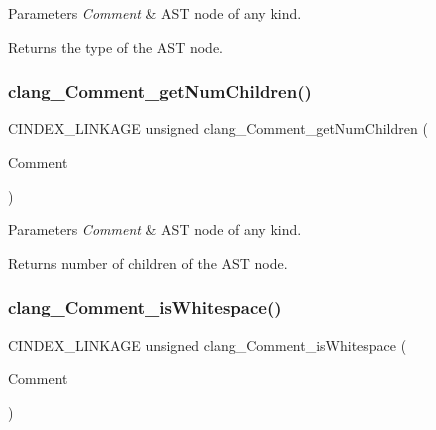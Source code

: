 \begin{DoxyParams}{Parameters}
{\em Comment} & A\+ST node of any kind.\\
\hline
\end{DoxyParams}
\begin{DoxyReturn}{Returns}
the type of the A\+ST node. 
\end{DoxyReturn}
\mbox{\label{group__CINDEX__COMMENT_gaad4eba69493735a4db462bb4b5bed97a}} 
\subsubsection{\texorpdfstring{clang\+\_\+\+Comment\+\_\+get\+Num\+Children()}{clang\_Comment\_getNumChildren()}}
{\footnotesize\ttfamily C\+I\+N\+D\+E\+X\+\_\+\+L\+I\+N\+K\+A\+GE unsigned clang\+\_\+\+Comment\+\_\+get\+Num\+Children (\begin{DoxyParamCaption}\item[{\hyperlink{structCXComment}{C\+X\+Comment}}]{Comment }\end{DoxyParamCaption})}


\begin{DoxyParams}{Parameters}
{\em Comment} & A\+ST node of any kind.\\
\hline
\end{DoxyParams}
\begin{DoxyReturn}{Returns}
number of children of the A\+ST node. 
\end{DoxyReturn}
\mbox{\label{group__CINDEX__COMMENT_ga1193c1dc798aecad92cb30cea78bf71e}} 
\subsubsection{\texorpdfstring{clang\+\_\+\+Comment\+\_\+is\+Whitespace()}{clang\_Comment\_isWhitespace()}}
{\footnotesize\ttfamily C\+I\+N\+D\+E\+X\+\_\+\+L\+I\+N\+K\+A\+GE unsigned clang\+\_\+\+Comment\+\_\+is\+Whitespace (\begin{DoxyParamCaption}\item[{\hyperlink{structCXComment}{C\+X\+Comment}}]{Comment }\end{DoxyParamCaption})}




